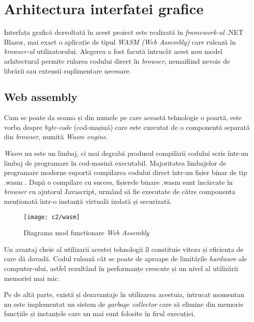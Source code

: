 \section{Arhitectura interfatei grafice}
Interfața grafică dezvoltată în acest proiect este realizată în \textit{framework-ul} .NET Blazor, mai exact o aplicație de tipul \textit{WASM (Web Assembly)} care rulează în \textit{browser-ul} utilizatorului. Alegerea a fost facută întrucât acest nou model arhitectural permite rularea codului direct în \textit{browser}, nemaifiind nevoie de librării sau extensii suplimentare necesare.\\

\newpage
\subsection*{Web assembly} 
Cum se poate da seama și din numele pe care această tehnologie o poartă, este vorba despre \textit{byte-code} (cod-mașină) care este executat de o componentă separată din \textit{browser}, numită \textit{Wasm engine}.

\textit{Wasm} nu este un limbaj, ci mai degrabă produsul compilării codului scris într-un limbaj de programare în cod-masină executabil. Majoritatea limbajelor de programare moderne  suportă compilarea codului direct într-un fișier  binar de tip .wasm . După o compilare cu succes, fișierele binare .wasm sunt încărcate în \textit{browser} cu ajutorul Javascript, urmând să fie executate de către componenta menționată într-o instanță virtuală izolată și securizată.\\

\vspace{1cm}
\begin{figure}[h]
	\centering
	
	\texttt{[image: c2/wasm]}
	\caption{Diagrama mod functionare \textit{Web Assembly}}
\end{figure}

Un avantaj cheie al utilizarii acestei tehnologii îl constituie viteza și eficiența de care dă dovadă. Codul rulează cât se poate de aproape de limitările \textit{hardware} ale computer-ului, astfel rezultând în performanțe crescute și un nivel al utilizării memoriei mai mic.

Pe de altă parte, există și dezavantaje în utilizarea acestuia, intrucat momentan nu este implementat un sistem de \textit{garbage collector} care să elimine din memorie funcțiile și instanțele care nu mai sunt folosite în firul execuției.

